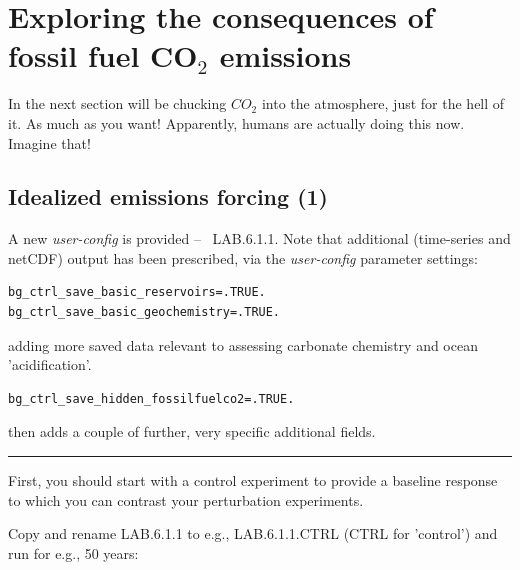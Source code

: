 \newpage

\section{Exploring the consequences of fossil fuel CO$_{2}$ emissions}

In the next section will be chucking \(CO_{2}\) into the atmosphere, just for the hell of it. As much as you want! Apparently, humans are actually doing this now. Imagine that!


\subsection{Idealized emissions forcing (1)}

A new \textit{user-config} is provided -- \textsf{\footnotesize\ LAB.6.1.1}. Note that additional (time-series and netCDF) output has been prescribed, via the \textit{user-config} parameter settings:

\vspace{-2mm}\footnotesize\begin{verbatim}
bg_ctrl_save_basic_reservoirs=.TRUE.
bg_ctrl_save_basic_geochemistry=.TRUE.
\end{verbatim}\normalsize\vspace{-2mm}
adding more saved data relevant to assessing carbonate chemistry and ocean 'acidification'.
\vspace{-2mm}\footnotesize\begin{verbatim}
bg_ctrl_save_hidden_fossilfuelco2=.TRUE.
\end{verbatim}\normalsize\vspace{-2mm}
then adds a couple of further, very specific additional fields.

\vspace{1mm}\noindent\rule{4cm}{0.1mm}\vspace{2mm}

\noindent First, you should start with a control experiment to provide a baseline response to which you can contrast your perturbation experiments.

\vspace{1mm}
Copy and rename \textsf{\footnotesize LAB.6.1.1} to e.g., \textsf{\footnotesize LAB.6.1.1.CTRL} (\textsf{\footnotesize CTRL} for 'control') and run for e.g., 50 years:

